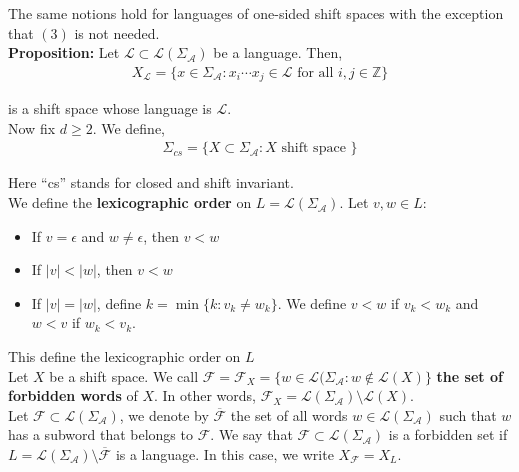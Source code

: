 \documentclass[12pt]{article}
\begin{document}
The same notions hold for languages of one-sided shift spaces with the exception that $(3)$ is not needed.\\

\textbf{Proposition:} Let $\mathcal{L} \subset \mathcal{L}(\Sigma_{\mathcal{A}})$ be a language. Then,
\begin{align*}
X_{\mathcal{L}} = \{x \in \Sigma_{\mathcal{A}}: x_i \cdots x_j \in \mathcal{L} \text{ for all } i, j \in \mathbb{Z}\}
\end{align*}

is a shift space whose language is $\mathcal{L}$.\\

Now fix $d \geq 2$. We define,
\begin{align*}
\Sigma_{cs} = \{X \subset \Sigma_{\mathcal{A}}: X \text{ shift space }\}
\end{align*}


Here ``cs'' stands for closed and shift invariant.\\

We define the \textbf{lexicographic order} on $L = \mathcal{L}(\Sigma_{\mathcal{A}})$. Let $v, w \in L$:
\begin{itemize}
\item If $v = \epsilon$ and $w \neq \epsilon$, then $v < w$

\item If $|v| < |w|$, then $v < w$

\item If $|v| = |w|$, define $k = \min \{k : v_k \neq w_k\}$. We define $v < w$ if $v_k < w_k$ and $w < v$ if $w_k < v_k$.
\end{itemize}

This define the lexicographic order on $L$\\

Let $X$ be a shift space. We call $\mathcal{F} = \mathcal{F}_X = \{w \in \mathcal{L}(\Sigma_{\mathcal{A}}: w \not\in \mathcal{L}(X)\}$ \textbf{the set of forbidden words} of $X$. In other words, $\mathcal{F}_X = \mathcal{L}(\Sigma_{\mathcal{A}}) \setminus \mathcal{L}(X)$.\\

Let $\mathcal{F} \subset \mathcal{L}(\Sigma_{\mathcal{A}})$, we denote by $\overline{\mathcal{F}}$ the set of all words $w \in \mathcal{L}(\Sigma_{\mathcal{A}})$ such that $w$ has a subword that belongs to $\mathcal{F}$. We say that $\mathcal{F} \subset \mathcal{L}(\Sigma_{\mathcal{A}})$ is a forbidden set if $L = \mathcal{L}(\Sigma_{\mathcal{A}}) \setminus \overline{\mathcal{F}}$ is a language. In this case, we write $X_{\mathcal{F}} = X_L$.\\
\end{document}

